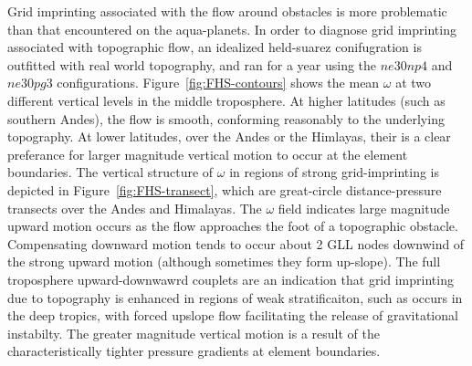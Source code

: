\documentclass[twocol]{ametsoc}
\begin{document}
Grid imprinting associated with the flow around obstacles is more problematic than that encountered on the aqua-planets. In order to diagnose grid imprinting associated with topographic flow, an idealized held-suarez conifugration \citep{HS1994} is outfitted with real world topography, and ran for a year using the $ne30np4$ and $ne30pg3$ configurations. Figure~\ref{fig:FHS-contours} shows the mean $\omega$ at two different vertical levels in the middle troposphere. At higher latitudes (such as southern Andes), the flow is smooth, conforming reasonably to the underlying topography. At lower latitudes, over the Andes or the Himlayas, their is a clear preferance for larger magnitude vertical motion to occur at the element boundaries. The vertical structure of $\omega$ in regions of strong grid-imprinting is depicted in Figure~\ref{fig:FHS-transect}, which are great-circle distance-pressure transects over the Andes and Himalayas. The $\omega$ field indicates large magnitude upward motion occurs as the flow approaches the foot of a topographic obstacle. Compensating downward motion tends to occur about 2 GLL nodes downwind of the strong upward motion (although sometimes they form up-slope). The full troposphere upward-downwawrd couplets are an indication that grid imprinting due to topography is enhanced in regions of weak stratificaiton, such as occurs in the deep tropics, with forced upslope flow facilitating the release of gravitational instabilty. The greater magnitude vertical motion is a result of the characteristically tighter pressure gradients at element boundaries. 
\end{document}
